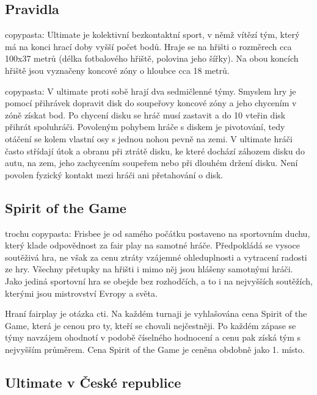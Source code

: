 \documentclass[thesis=B,czech]{FITthesis}[2012/06/26]
\begin{document}
\subsection{Pravidla}

\indent

copypasta:
Ultimate je kolektivní bezkontaktní sport, v němž vítězí tým, který má na konci hrací doby vyšší počet bodů.
Hraje se na hřišti o rozměrech cca 100x37 metrů (délka fotbalového hřiště, polovina jeho šířky).
Na obou koncích hřiště jsou vyznačeny koncové zóny o hloubce cca 18 metrů.

\medskip

copypasta:
V ultimate proti sobě hrají dva sedmičlenné týmy. Smyslem hry je pomocí přihrávek dopravit disk do soupeřovy koncové zóny
a jeho chycením v zóně získat bod. Po chycení disku se hráč musí zastavit a do 10 vteřin disk přihrát spoluhráči.
Povoleným pohybem hráče s diskem je pivotování, tedy otáčení se kolem vlastní osy s jednou nohou pevně na zemi.
V ultimate hráči často střídají útok a obranu při ztrátě disku, ke které dochází záhozem disku do autu, na zem,
jeho zachycením soupeřem nebo při dlouhém držení disku. Není povolen fyzický kontakt mezi hráči ani přetahování o disk.

\subsection{Spirit of the Game}

\indent

trochu copypasta:
Frisbee je od samého počátku postaveno na sportovním duchu, který klade odpovědnost za fair play na samotné hráče.
Předpokládá se vysoce soutěživá hra, ne však za cenu ztráty vzájemné ohleduplnosti a vytracení radosti ze hry.
Všechny přetupky na hřišti i mimo něj jsou hlášeny samotnými hráči. Jako jediná sportovní hra se obejde bez rozhodčích,
a to i na nejvyšších soutěžích, kterými jsou mistrovství Evropy a světa.

\medskip

Hraní fairplay je otázka cti. Na každém turnaji je vyhlašována cena Spirit of the Game, která je cenou pro ty, kteří se chovali nejčestněji.
Po každém zápase se týmy navzájem ohodnotí v podobě číselného hodnocení a cenu pak získá tým s nejvyšším průměrem.
Cena Spirit of the Game je ceněna obdobně jako 1. místo.

\subsection{Ultimate v České republice}
\end{document}
